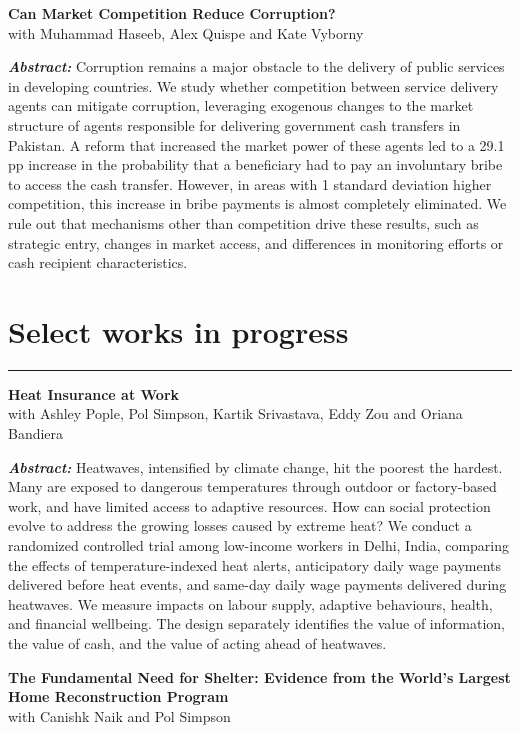 \documentclass[10.5pt]{article}
\newcommand{\resumesection}[1]{\vspace{0.05cm}\section*{\large #1}\vspace{-0.2cm}\hrule\vspace{0.25cm}}
\newcommand{\paperabstract}[1]{%
  \vspace{.15cm}%
  \begin{list}{}{%
    \setlength{\leftmargin}{1.4em}%
    \setlength{\rightmargin}{0em}%
    \setlength{\topsep}{0pt}%
    \setlength{\partopsep}{0pt}%
    \setlength{\itemsep}{0pt}%
    \setlength{\parsep}{0pt}%
  }%
  \item[] {\small\textbf{\textit{Abstract:}} #1}%
  \end{list}%
  \vspace{.4cm}%
}
\begin{document}
\textbf{{Can Market Competition Reduce Corruption?}} \vspace*{.1cm} \\with Muhammad Haseeb, Alex Quispe and Kate Vyborny

\paperabstract{Corruption remains a major obstacle to the delivery of public services in developing countries. We study whether competition between service delivery agents can mitigate corruption, leveraging exogenous changes to the market structure of agents responsible for delivering government cash transfers in Pakistan. A reform that increased the market power of these agents led to a 29.1 pp increase in the probability that a beneficiary had to pay an involuntary bribe to access the cash transfer. However, in areas with 1 standard deviation higher competition, this increase in bribe payments is almost completely eliminated. We rule out that mechanisms other than competition drive these results, such as strategic entry, changes in market access, and differences in monitoring efforts or cash recipient characteristics.}


\resumesection{Select works in progress}

\textbf{{Heat Insurance at Work}} \vspace*{.1cm} \\with Ashley Pople, Pol Simpson, Kartik Srivastava, Eddy Zou and Oriana Bandiera

\paperabstract{Heatwaves, intensified by climate change, hit the poorest the hardest. Many are exposed to dangerous temperatures through outdoor or factory-based work, and have limited access to adaptive resources. How can social protection evolve to address the growing losses caused by extreme heat? We conduct a randomized controlled trial among low-income workers in Delhi, India, comparing the effects of temperature-indexed heat alerts, anticipatory daily wage payments delivered before heat events, and same-day daily wage payments delivered during heatwaves. We measure impacts on labour supply, adaptive behaviours, health, and financial wellbeing. The design separately identifies the value of information, the value of cash, and the value of acting ahead of heatwaves.}


\textbf{{The Fundamental Need for Shelter: Evidence from the World’s Largest Home Reconstruction Program}}  \vspace*{.1cm} \\ with Canishk Naik and Pol Simpson
\end{document}
